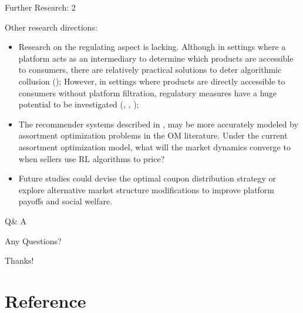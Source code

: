 \documentclass[8pt]{beamer}
\begin{document}
\begin{frame}{Further Research: 2}
    \small{
    Other research directions:
    \begin{itemize}
        \item Research on the regulating aspect is lacking. Although in settings where a platform acts as an intermediary to determine which products are accessible to consumers, there are relatively practical solutions to deter algorithmic collusion (\cite{johnson2023platform}); However, in settings where products are directly accessible to consumers without platform filtration, regulatory measures have a huge potential to be investigated (\cite{harrington2018developing}, \cite{abada2023artificial}, \cite{hartline2024regulation});
        \item The recommender systems described in \cite{johnson2023platform}, \cite{xu2023algorithmic} may be more accurately modeled by assortment optimization problems in the OM literature. Under the current assortment optimization model, what will the market dynamics converge to when sellers use RL algorithms to price?
        \item Future studies could devise the optimal coupon distribution strategy or explore alternative market structure modifications to improve platform payoffs and social welfare. 
    \end{itemize}
    }
\end{frame}

\begin{frame}{Q\& A}
    \begin{center}
      {\Hugek Any Questions?}
  \end{center}
\end{frame}

\begin{frame}
  \begin{center}
      {\Hugek Thanks!}
  \end{center}
\end{frame}

\section{Reference}

\begin{frame}[allowframebreaks]
  
  
\end{frame}
\end{document}
